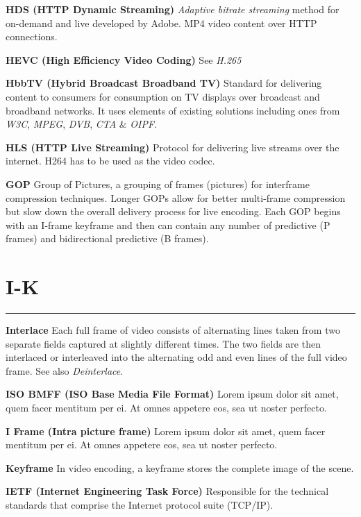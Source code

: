 \smallskip
\textbf{HDS (HTTP Dynamic Streaming)}
\textit{Adaptive bitrate streaming} method for on-demand and live developed by Adobe. MP4 video content over HTTP connections.

\smallskip
\textbf{HEVC (High Efficiency Video Coding)}
See \textit{H.265}

\smallskip
\textbf{HbbTV (Hybrid Broadcast Broadband TV)}
Standard for delivering content to consumers for consumption on TV displays over broadcast and broadband networks. It uses elements of existing solutions including ones from \textit{W3C}, \textit{MPEG}, \textit{DVB}, \textit{CTA} \& \textit{OIPF}.

\smallskip
\textbf{HLS (HTTP Live Streaming)}
Protocol for delivering live streams over the internet.
H264 has to be used as the video codec.



\smallskip
\textbf{GOP}
Group of Pictures, a grouping of frames (pictures) for interframe compression techniques. Longer GOPs allow for better multi-frame compression but slow down the overall delivery process for live encoding. Each GOP begins with an I-frame keyframe and then can contain any number of predictive (P frames) and bidirectional predictive (B frames).


\section{I-K}
\hrule

\medskip
\textbf{Interlace}
Each full frame of video consists of alternating lines taken from two separate fields captured at slightly different times. The two fields are then interlaced or interleaved into the alternating odd and even lines of the full video frame.  See also \textit{Deinterlace}.

\smallskip
\textbf{ISO BMFF (ISO Base Media File Format)}
Lorem ipsum dolor sit amet, quem facer mentitum per ei. At omnes appetere eos, sea ut noster perfecto.

\smallskip
\textbf{I Frame (Intra picture frame)}
Lorem ipsum dolor sit amet, quem facer mentitum per ei. At omnes appetere eos, sea ut noster perfecto.

\smallskip
\textbf{Keyframe}
In video encoding, a keyframe stores the complete image of the scene.

\smallskip
\textbf{IETF (Internet Engineering Task Force)}
Responsible for the technical standards that comprise the Internet protocol suite (TCP/IP).

